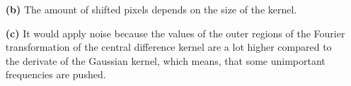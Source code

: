 \documentclass[10pt,a4paper]{scrartcl}
\begin{document}

\begin{itemize}
\item[\textbf{(b)}] The amount of shifted pixels depends on the size of the kernel.
\item[\textbf{(c)}] It would apply noise because the values of the outer regions of the Fourier transformation of the central difference kernel are a lot higher compared to the derivate of the Gaussian kernel, which means, that some unimportant frequencies are pushed.
\end{itemize}


\end{document}
